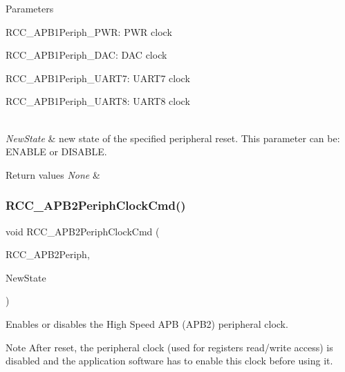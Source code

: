 \begin{DoxyParams}{Parameters}
\begin{DoxyItemize}
R\+C\+C\+\_\+\+A\+P\+B1\+Periph\+\_\+\+P\+WR\+: P\+WR clock \item R\+C\+C\+\_\+\+A\+P\+B1\+Periph\+\_\+\+D\+AC\+: D\+AC clock \item R\+C\+C\+\_\+\+A\+P\+B1\+Periph\+\_\+\+U\+A\+R\+T7\+: U\+A\+R\+T7 clock \item R\+C\+C\+\_\+\+A\+P\+B1\+Periph\+\_\+\+U\+A\+R\+T8\+: U\+A\+R\+T8 clock ~\newline
\end{DoxyItemize}
\\
\hline
{\em New\+State} & new state of the specified peripheral reset. This parameter can be\+: E\+N\+A\+B\+LE or D\+I\+S\+A\+B\+LE. \\
\hline
\end{DoxyParams}

\begin{DoxyRetVals}{Return values}
{\em None} & \\
\hline
\end{DoxyRetVals}
\mbox{\label{group___r_c_c_ga56ff55caf8d835351916b40dd030bc87}} 
\subsubsection{\texorpdfstring{R\+C\+C\+\_\+\+A\+P\+B2\+Periph\+Clock\+Cmd()}{RCC\_APB2PeriphClockCmd()}}
{\footnotesize\ttfamily void R\+C\+C\+\_\+\+A\+P\+B2\+Periph\+Clock\+Cmd (\begin{DoxyParamCaption}\item[{uint32\+\_\+t}]{R\+C\+C\+\_\+\+A\+P\+B2\+Periph,  }\item[{Functional\+State}]{New\+State }\end{DoxyParamCaption})}



Enables or disables the High Speed A\+PB (A\+P\+B2) peripheral clock. 

\begin{DoxyNote}{Note}
After reset, the peripheral clock (used for registers read/write access) is disabled and the application software has to enable this clock before using it. 
\end{DoxyNote}

